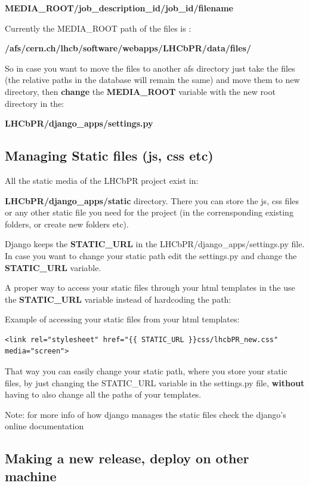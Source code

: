 \documentclass{lhcbnote}
\begin{document}
{\bf MEDIA\_ROOT/job\_description\_id/job\_id/filename}

Currently the MEDIA\_ROOT path of the files is : 

{\bf /afs/cern.ch/lhcb/software/webapps/LHCbPR/data/files/}

So in case you want to move the files to another afs directory just take the files (the relative paths in the database will remain the same) and move 
them to new directory, then {\bf change} the {\bf MEDIA\_ROOT} variable with the new root directory in the:

{\bf LHCbPR/django\_apps/settings.py}

\subsection {Managing Static files (js, css etc)}

All the static media of the LHCbPR project exist in:

{\bf LHCbPR/django\_apps/static} directory. There you can store the js, css files or any other static file you 
need for the project (in the corrensponding existing folders, or create new folders etc).

Django keeps the {\bf STATIC\_URL} in the LHCbPR/django\_apps/settings.py file.
In case you want to change your static path edit the settings.py and change the {\bf STATIC\_URL} variable.

\vspace {2mm}

A proper way to access your static files through your html templates in the use the {\bf STATIC\_URL} variable instead of hardcoding the path:

Example of accessing your static files from your html templates:
\begin{verbatim}
<link rel="stylesheet" href="{{ STATIC_URL }}css/lhcbPR_new.css" media="screen">
\end{verbatim} 

That way you can easily change your static path, where you store your static files, by just changing the STATIC\_URL variable in the settings.py file, {\bf without} having to also change 
all the paths of your templates.

\vspace{3mm}
Note: for more info of how django manages the static files check the django's online documentation

\subsection {Making a new release, deploy on other machine}
\end{document}
